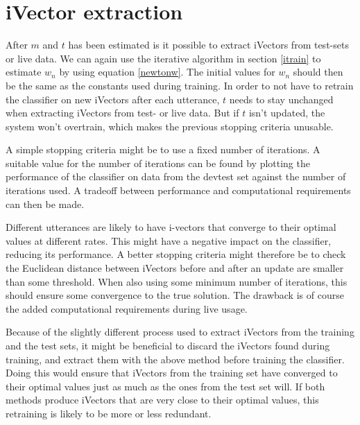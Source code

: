 \section{iVector extraction}

After $m$ and $t$ has been estimated is it possible to extract iVectors from test-sets or live data. We can again use the iterative algorithm in section \ref{itrain} to estimate $w_n$ by using equation \ref{newtonw}. The initial values for $w_n$ should then be the same as the constants used during training. In order to not have to retrain the classifier on new iVectors after each utterance, $t$ needs to stay unchanged when extracting iVectors from test- or live data. But if  $t$ isn't updated, the system won't overtrain, which makes the previous stopping criteria unusable. 

A simple stopping criteria might be to use a fixed number of iterations. A suitable value for the number of iterations can be found by plotting the performance of the classifier on data from the devtest set against the number of iterations used. A tradeoff between performance and computational requirements can then be made. 

Different utterances are likely to have i-vectors that converge to their optimal values at different rates. This might have a negative impact on the classifier, reducing its performance. A better stopping criteria might therefore be to check the Euclidean distance between iVectors before and after an update are smaller than some threshold. When also using some minimum number of iterations, this should ensure some convergence to the true solution. The drawback is of course the added computational requirements during live usage.

Because of the slightly different process used to extract iVectors from the training and the test sets, it might be beneficial to discard the iVectors found during training, and extract them with the above method before training the classifier. Doing this would ensure that iVectors from the training set have converged to their optimal values just as much as the ones from the test set will. If both methods produce iVectors that are very close to their optimal values, this retraining is likely to be more or less redundant.